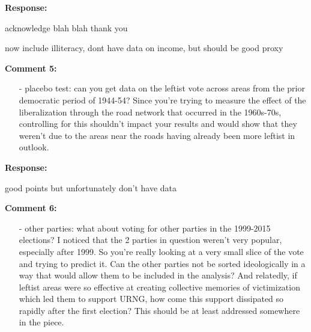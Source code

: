 \documentclass[12pt, a4paper, notitlepage]{article}
\begin{document}
\noindent\textbf{Response:} {}

acknowledge blah blah thank you

now include illiteracy, dont have data on income, but should be good proxy

\vspace{15pt}
\noindent\textbf{Comment 5:}
\begin{displayquote}
\begin{itemize}
\item[-] placebo test: can you get data on the leftist vote across areas from the prior democratic period of 1944-54? Since you’re trying to measure the effect of the liberalization through the road network that occurred in the 1960s-70s, controlling for this shouldn’t impact your results and would show that they weren’t due to the areas near the roads having already been more leftist in outlook.
\end{itemize}
\end{displayquote}

\noindent\textbf{Response:} {}

good points but unfortunately don't have data

\vspace{15pt}
\noindent\textbf{Comment 6:}
\begin{displayquote}
\begin{itemize}
\item[-] other parties: what about voting for other parties in the 1999-2015 elections? I noticed that the 2 parties in question weren’t very popular, especially after 1999. So you’re really looking at a very small slice of the vote and trying to predict it. Can the other parties not be sorted ideologically in a way that would allow them to be included in the analysis? And relatedly, if leftist areas were so effective at creating collective memories of victimization which led them to support URNG, how come this support dissipated so rapidly after the first election? This should be at least addressed somewhere in the piece.
\end{itemize}
\end{displayquote}
\end{document}
